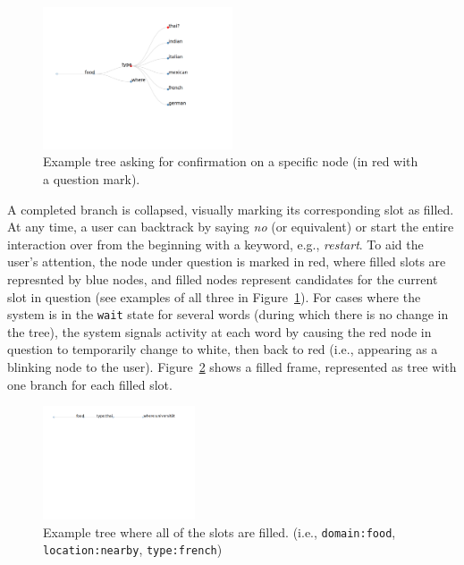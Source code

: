 \documentclass[11pt]{article}
\begin{document}
\begin{figure}[ht]
  \centering
      \includegraphics[width=0.5\textwidth]{figures/diatree-confirmation.pdf}	
      \caption{Example tree asking for confirmation on a specific node (in red with a question mark).\label{fig:confirm}}
\end{figure}

A completed branch is collapsed, visually marking its corresponding slot as filled. At any time, a user can backtrack by saying \emph{no} (or equivalent) or start the entire interaction over from the beginning with a keyword, e.g., \emph{restart}. To aid the user's attention, the node under question is marked in red, where filled slots are represnted by blue nodes, and filled nodes represent candidates for the current slot in question (see examples of all three in Figure~\ref{fig:confirm}). For cases where the system is in the \texttt{wait} state for several words (during which there is no change in the tree), the system signals activity at each word by causing the red node in question to temporarily change to white, then back to red (i.e., appearing as a blinking node to the user). Figure~\ref{fig:filled} shows a filled frame, represented as tree with one branch for each filled slot.

\begin{figure}[ht]
  \centering
      \includegraphics[width=0.4\textwidth]{figures/diatree-filled.pdf}	
      \caption{Example tree where all of the slots are filled. (i.e., \texttt{domain:food}, \texttt{location:nearby}, \texttt{type:french}) \label{fig:filled}}
\end{figure}
\end{document}
